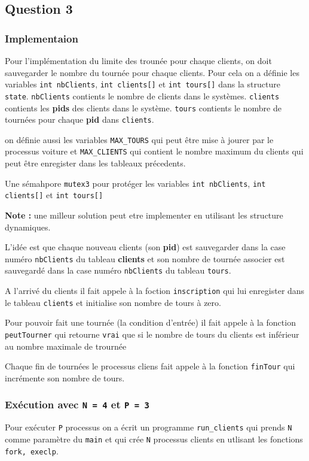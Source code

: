 \subsection{Question 3}
\subsubsection{Implementaion}
Pour l'implémentation du limite des trounée pour chaque clients, on doit
sauvegarder le nombre du tournée pour chaque clients. Pour cela on a définie les
variables \texttt{int nbClients}, \texttt{int clients[]} et \texttt{int
  tours[]} dans la structure \texttt{state}.
\texttt{nbClients} contients le nombre de clients dans le systèmes.
\texttt{clients} contients les \textbf{pids} des clients dans le système.
\texttt{tours} contients le nombre de tournées pour chaque \textbf{pid} dans
\texttt{clients}.

on définie aussi les variables \texttt{MAX\_TOURS} qui peut être mise à jourer
par le processus voiture et \texttt{MAX\_CLIENTS} qui contient le nombre maximum
du clients qui peut être enregister dans les tableaux précedents.

Une sémahpore \texttt{mutex3} pour protéger les variables \texttt{int nbClients}, \texttt{int clients[]} et \texttt{int
  tours[]}

\textbf{Note :} une milleur solution peut etre implementer en utilisant les structure
dynamiques.

L'idée est que chaque nouveau clients (son \textbf{pid}) est sauvegarder dans la
case numéro \texttt{nbClients} du tableau \textbf{clients} et son nombre de
tournée associer est sauvegardé dans la case numéro \texttt{nbClients} du
tableau \texttt{tours}.

A l'arrivé du clients il fait appele à la foction \texttt{inscription} qui lui
enregister dans le tableau \texttt{clients} et initialise son nombre de tours à zero.

Pour pouvoir fait une tournée (la condition d'entrée) il fait appele à la
fonction  \texttt{peutTourner} qui retourne \texttt{vrai} que si le nombre de
tours du clients est inférieur au nombre maximale de trournée

Chaque fin de tournées le processus cliens fait appele à la fonction
\texttt{finTour} qui incrémente son nombre de tours.

\subsubsection{Exécution avec \texttt{N = 4} et \texttt{P = 3}}
Pour exécuter \texttt{P} processus on a écrit un programme \texttt{run\_clients}
qui prends \texttt{N} comme  paramètre du \texttt{main} et qui crée \texttt{N}
processus clients en utlisant les fonctions \texttt{fork, execlp}.

